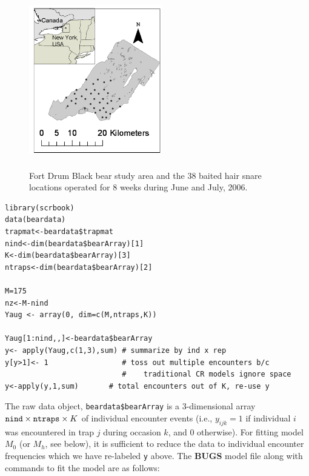 \begin{figure}
\centering
\includegraphics[height=3in,width=2.28in]{Ch3-Closed/figs/hairsnares.png}
\caption{Fort Drum Black bear study area and the 38 baited hair snare
  locations operated for 8 weeks during June and July, 2006.}
\label{closed.fig.fortdrum}
\end{figure}

{\small
\begin{verbatim}
library(scrbook)
data(beardata)
trapmat<-beardata$trapmat
nind<-dim(beardata$bearArray)[1]
K<-dim(beardata$bearArray)[3]
ntraps<-dim(beardata$bearArray)[2]

M=175
nz<-M-nind
Yaug <- array(0, dim=c(M,ntraps,K))

Yaug[1:nind,,]<-beardata$bearArray
y<- apply(Yaug,c(1,3),sum) # summarize by ind x rep
y[y>1]<- 1                 # toss out multiple encounters b/c
                           #    traditional CR models ignore space
y<-apply(y,1,sum)       # total encounters out of K, re-use y
\end{verbatim}
}


The raw data object, \mbox{\tt beardata\$bearArray} is a 3-dimensional
array $\mbox{\tt nind} \times \mbox{\tt ntraps} \times K$ of
individual encounter events (i.e., $y_{ijk} = 1$ if individual $i$ was
encountered in trap $j$ during occasion $k$, and 0 otherwise).  For
fitting model $M_{0}$ (or $M_{h}$, see below), it is sufficient to
reduce the data to individual encounter frequencies which we have
re-labeled \mbox{\tt y} above.  The {\bf BUGS} model file along with
commands to fit the model are as follows:

